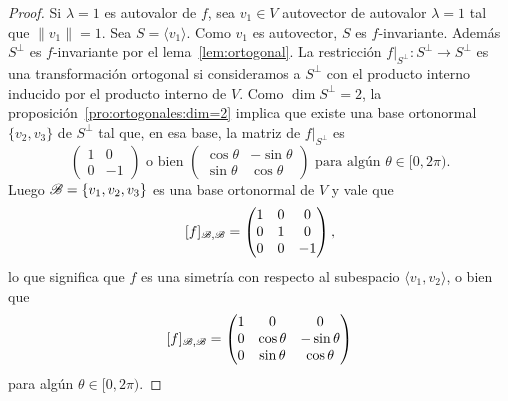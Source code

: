 \begin{prop}
\begin{proof}
        Si $\lambda=1$ es autovalor de $f$, sea $v_1\in V$ autovector de
        autovalor $\lambda=1$ tal que $\|v_1\|=1$. Sea $S=\langle v_1\rangle$.
        Como $v_1$ es autovector, $S$ es $f$-invariante. Además $S^\perp$ es
        $f$-invariante por el lema~\ref{lem:ortogonal}. La restricción
        $f|_{S^\perp}\colon S^\perp\to S^\perp$ es una transformación ortogonal
        si consideramos a $S^\perp$ con el producto interno inducido por el
        producto interno de $V$. Como $\dim S^\perp=2$, la
        proposición~\ref{pro:ortogonales:dim=2} implica que existe una base
        ortonormal $\{v_2,v_3\}$ de $S^\perp$ tal que, en esa base, la matriz
        de $f|_{S^\perp}$ es 
        \[
        \begin{pmatrix}
            1 & 0\\
            0 & -1
        \end{pmatrix}
        \text{ o bien }
        \begin{pmatrix}
            \cos\theta & -\sin\theta\\
            \sin\theta & \cos\theta
        \end{pmatrix}
        \text{ para algún $\theta\in[0,2\pi)$.}
        \]
        Luego $\mathscr{B}=\{v_1,v_2,v_3\}$ es una base ortonormal de $V$ y vale que 
         \[
         [f]_{\mathscr{B},\mathscr{B}}=
         \begin{pmatrix}
            1 & 0 & 0\\
            0 & 1 & 0\\
            0 & 0 & -1
        \end{pmatrix},
        \]
        lo que significa que $f$ es una simetría con respecto al subespacio
        $\langle v_1,v_2\rangle$, o bien que 
        \[
         [f]_{\mathscr{B},\mathscr{B}}=
        \begin{pmatrix}
            1 & 0 & 0\\
            0 & \cos\theta & -\sin\theta\\
            0 & \sin\theta & \cos\theta
        \end{pmatrix}
        \]
        para algún $\theta\in[0,2\pi)$.


\end{proof}
\end{prop}

